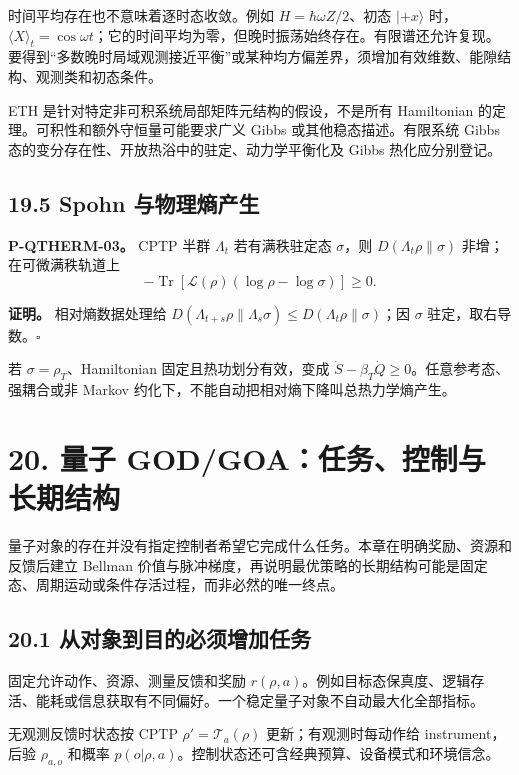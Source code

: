\documentclass[
  11pt,
  oneside]{book}
\begin{document}
时间平均存在也不意味着逐时态收敛。例如 \(H=\hbar\omega Z/2\)、初态
\(|+x\rangle\)
时，\(\langle X\rangle_t=\cos\omega t\)；它的时间平均为零，但晚时振荡始终存在。有限谱还允许复现。要得到``多数晚时局域观测接近平衡''或某种均方偏差界，须增加有效维数、能隙结构、观测类和初态条件。

ETH 是针对特定非可积系统局部矩阵元结构的假设，不是所有 Hamiltonian
的定理。可积性和额外守恒量可能要求广义 Gibbs 或其他稳态描述。有限系统
Gibbs 态的变分存在性、开放热浴中的驻定、动力学平衡化及 Gibbs
热化应分别登记。

\section{19.5 Spohn 与物理熵产生}

\protect\hypertarget{p-qtherm-03}{}{}

\textbf{P-QTHERM-03。} CPTP 半群 \(\Lambda_t\) 若有满秩驻定态
\(\sigma\)，则 \(D(\Lambda_t\rho\|\sigma)\) 非增；在可微满秩轨道上 \[
-\operatorname{Tr}[\mathcal L(\rho)(\log\rho-\log\sigma)]\ge0.
\]

\textbf{证明。} 相对熵数据处理给
\(D(\Lambda_{t+s}\rho\|\Lambda_s\sigma) \le D(\Lambda_t\rho\|\sigma)\)；因
\(\sigma\) 驻定，取右导数。\(\square\)

若 \(\sigma=\rho_T\)、Hamiltonian 固定且热功划分有效，变成
\(\dot S-\beta_T\dot Q\ge0\)。任意参考态、强耦合或非 Markov
约化下，不能自动把相对熵下降叫总热力学熵产生。

\chapter{20. 量子 GOD/GOA：任务、控制与长期结构}\label{ch-20}\hypertarget{ch-20}{}

量子对象的存在并没有指定控制者希望它完成什么任务。本章在明确奖励、资源和反馈后建立
Bellman
价值与脉冲梯度，再说明最优策略的长期结构可能是固定态、周期运动或条件存活过程，而非必然的唯一终点。

\section{20.1 从对象到目的必须增加任务}

固定允许动作、资源、测量反馈和奖励
\(r(\rho,a)\)。例如目标态保真度、逻辑存活、能耗或信息获取有不同偏好。一个稳定量子对象不自动最大化全部指标。

无观测反馈时状态按 CPTP \(\rho'=\mathcal T_a(\rho)\)
更新；有观测时每动作给 instrument，后验 \(\rho_{a,o}\) 和概率
\(p(o|\rho,a)\)。控制状态还可含经典预算、设备模式和环境信念。
\end{document}
